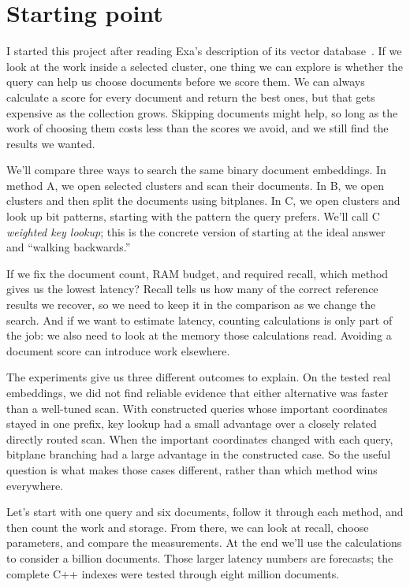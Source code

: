 \section{Starting point}
I started this project after reading Exa's description of its vector database~\cite{exa}.
If we look at the work inside a selected cluster, one thing we can explore is whether the
query can help us choose documents before we score them. We can always calculate a score
for every document and return the best ones, but that gets expensive as the collection grows.
Skipping documents might help, so long as the work of choosing them costs less than the scores
we avoid, and we still find the results we wanted.

We'll compare three ways to search the same binary document embeddings. In method A, we open
selected clusters and scan their documents. In B, we open clusters and then split the documents
using bitplanes. In C, we open clusters and look up bit patterns, starting with the pattern
the query prefers. We'll call C \emph{weighted key lookup}; this is the concrete version of
starting at the ideal answer and ``walking backwards.''

If we fix the document count, RAM budget, and required recall, which method gives us the lowest
latency? Recall tells us how many of the correct reference results we recover, so we need to
keep it in the comparison as we change the search. And if we want to estimate latency, counting
calculations is only part of the job: we also need to look at the memory those calculations
read. Avoiding a document score can introduce work elsewhere.

The experiments give us three different outcomes to explain. On the tested real embeddings,
we did not find reliable evidence that either alternative was faster than a well-tuned scan. With constructed
queries whose important coordinates stayed in one prefix, key lookup had a small advantage
over a closely related directly routed scan. When the important coordinates changed with
each query, bitplane branching had a large advantage in the constructed case. So the useful
question is what makes those cases different, rather than which method wins everywhere.

Let's start with one query and six documents, follow it through each method, and then count
the work and storage. From there, we can look at recall, choose parameters, and compare the
measurements. At the end we'll use the calculations to consider a billion documents. Those
larger latency numbers are forecasts; the complete C++ indexes were tested through eight
million documents.


